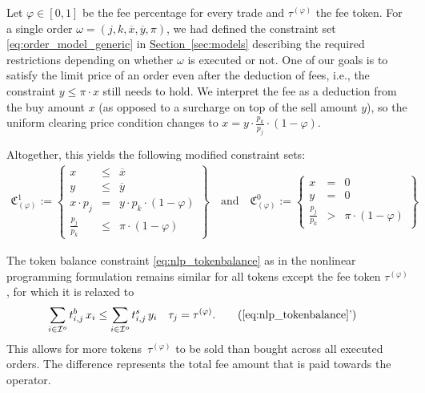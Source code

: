 \documentclass[11pt,parskip=full]{scrartcl}%
\newcommand*{\ie}{i.e., }
\newcommand*{\iorders}{\mathcal{I}^o}       %
\newcommand*{\secref}[1]{\hyperref[{#1}]{Section~\ref*{#1}}}
\begin{document}
Let $\varphi \in [0,1]$ be the fee percentage for every trade and $\tau^{(\varphi)}$ the fee token.
For a single order $\omega = (j,k,\overline{x},\overline{y},\pi)$, we had defined the constraint set \eqref{eq:order_model_generic} in \secref{sec:models} describing the required restrictions depending on whether $\omega$ is executed or not.
One of our goals is to satisfy the limit price of an order even after the deduction of fees, \ie the constraint $y \le \pi \cdot x$ still needs to hold.
We interpret the fee as a deduction from the buy amount $x$ (as opposed to a surcharge on top of the sell amount $y$), so the uniform clearing price condition changes to $x = y \cdot \frac{p_k}{p_j} \cdot (1-\varphi)$.

Altogether, this yields the following modified constraint sets:
\begin{align}
  \mathfrak{C}^1_{(\varphi)} := \left\{
  \begin{array}{rll}
    x &\le & \overline{x} \\
    y &\le & \overline{y} \\
    x \cdot p_j &= & y \cdot p_k \cdot (1-\varphi) \\[1mm]
    \frac{p_j}{p_k} &\le & \pi \cdot (1-\varphi)
  \end{array}
  \right\}
  \quad
  \text{and}
  \quad
  \mathfrak{C}^0_{(\varphi)} := \left\{
  \begin{array}{rll}
    x &= & 0 \\
    y &= & 0 \\[1mm]
    \frac{p_j}{p_k} &> & \pi \cdot (1-\varphi)
  \end{array}
  \right\}
  \label{eq:order_model_generic_fee}
\end{align}

The token balance constraint \eqref{eq:nlp_tokenbalance} as in the nonlinear programming formulation remains similar for all tokens except the fee token $\tau^{(\varphi)}$, for which it is relaxed to
\begin{align}
  \sum\limits_{i \in \iorders} t^b_{i,j} \, x_i
  &\le \sum\limits_{i \in \iorders} t^s_{i,j} \, y_i
  && \tau_j = \tau^{(\varphi)}.
  \tag{\ref{eq:nlp_tokenbalance}'}
\end{align}
This allows for more tokens~$\tau^{(\varphi)}$ to be sold than bought across all executed orders.
The difference represents the total fee amount that is paid towards the operator.
\end{document}
